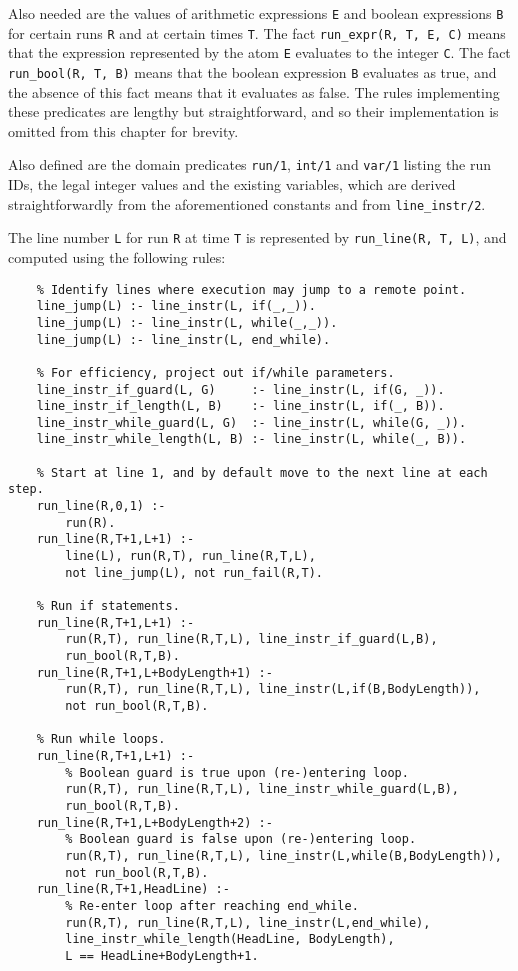 \documentclass[a4paper,twoside,notitlepage]{report}
\begin{document}
Also needed are the values of arithmetic expressions \verb|E| and boolean 
expressions \verb|B| for certain runs \verb|R| and at certain times 
\verb|T|. The fact \verb|run_expr(R, T, E, C)| means that the expression 
represented by the atom \verb|E| evaluates to the integer \verb|C|. The 
fact \verb|run_bool(R, T, B)| means that the boolean expression \verb|B| 
evaluates as true, and the absence of this fact means that it evaluates as 
false. The rules implementing these predicates are lengthy but 
straightforward, and so their implementation is omitted from this chapter 
for brevity.

Also defined are the domain predicates \verb|run/1|, \verb|int/1| and 
\verb|var/1| listing the run IDs, the legal integer values and the 
existing variables, which are derived straightforwardly from the 
aforementioned constants and from \verb|line_instr/2|.

The line number \verb|L| for run \verb|R| at time \verb|T| is represented 
by \verb|run_line(R, T, L)|, and computed using the following rules:
\begin{Verbatim}
    % Identify lines where execution may jump to a remote point.
    line_jump(L) :- line_instr(L, if(_,_)).
    line_jump(L) :- line_instr(L, while(_,_)).
    line_jump(L) :- line_instr(L, end_while).
    
    % For efficiency, project out if/while parameters.
    line_instr_if_guard(L, G)     :- line_instr(L, if(G, _)).
    line_instr_if_length(L, B)    :- line_instr(L, if(_, B)).
    line_instr_while_guard(L, G)  :- line_instr(L, while(G, _)).
    line_instr_while_length(L, B) :- line_instr(L, while(_, B)).
    
    % Start at line 1, and by default move to the next line at each step.
    run_line(R,0,1) :-
        run(R).
    run_line(R,T+1,L+1) :-
        line(L), run(R,T), run_line(R,T,L),
        not line_jump(L), not run_fail(R,T).
    
    % Run if statements.
    run_line(R,T+1,L+1) :-
        run(R,T), run_line(R,T,L), line_instr_if_guard(L,B),
        run_bool(R,T,B).
    run_line(R,T+1,L+BodyLength+1) :-
        run(R,T), run_line(R,T,L), line_instr(L,if(B,BodyLength)),
        not run_bool(R,T,B).
    
    % Run while loops.
    run_line(R,T+1,L+1) :-
        % Boolean guard is true upon (re-)entering loop.
        run(R,T), run_line(R,T,L), line_instr_while_guard(L,B),
        run_bool(R,T,B).
    run_line(R,T+1,L+BodyLength+2) :-
        % Boolean guard is false upon (re-)entering loop.
        run(R,T), run_line(R,T,L), line_instr(L,while(B,BodyLength)),
        not run_bool(R,T,B).
    run_line(R,T+1,HeadLine) :-
        % Re-enter loop after reaching end_while.
        run(R,T), run_line(R,T,L), line_instr(L,end_while),
        line_instr_while_length(HeadLine, BodyLength),
        L == HeadLine+BodyLength+1.
\end{Verbatim}
\end{document}
